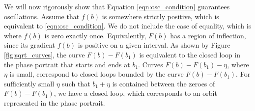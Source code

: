 \documentclass{report}
\begin{document}
We will now rigorously show that Equation \ref{eqn:osc_condition} guarantees oscillations.
Assume that $f(b)$ is somewhere strictly positive, which is equivalent to \ref{eqn:osc_condition}.
We do not include the case of equality,
which is where $f(b)$ is zero exactly once.
Equivalently, $F(b)$ has a region of inflection,
since its gradient $f(b)$ is positive on a given interval.
As shown by Figure \ref{fig:sqrt_curves},
the curve $F(b)-F(b_1)$ is equivalent to the closed loop in the phase portrait that starts and ends at $b_1$.
Curves $F(b)-F(b_1)-\eta$, where $\eta$ is small,
correspond to closed loops bounded by the curve $F(b)-F(b_1)$.
For sufficiently small $\eta$ such that $b_1+\eta$ is contained between the zeroes of $F(b)-F(b_1)$,
we have a closed loop, which corresponds to an orbit represented in the phase portrait.











\end{document}

